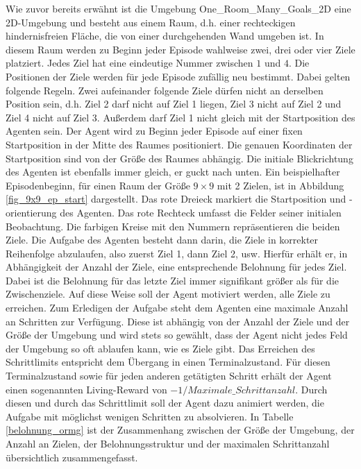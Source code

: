 Wie zuvor bereits erwähnt ist die Umgebung \glqq One\_Room\_Many\_Goals\_2D\grqq{} eine 2D-Umgebung und besteht aus einem Raum, d.h. einer rechteckigen hindernisfreien Fläche, die von einer durchgehenden Wand umgeben ist. In diesem Raum werden zu Beginn jeder Episode wahlweise zwei, drei oder vier Ziele platziert. Jedes Ziel hat eine eindeutige Nummer zwischen $1$ und $4$. Die Positionen der Ziele werden für jede Episode zufällig neu bestimmt. Dabei gelten folgende Regeln. Zwei aufeinander folgende Ziele dürfen nicht an derselben Position sein, d.h. Ziel 2 darf nicht auf Ziel 1 liegen, Ziel 3 nicht auf Ziel 2 und Ziel 4 nicht auf Ziel 3. Außerdem darf Ziel 1 nicht gleich mit der Startposition des Agenten sein. Der Agent wird zu Beginn jeder Episode auf einer fixen Startposition in der Mitte des Raumes positioniert. Die genauen Koordinaten der Startposition sind von der Größe des Raumes abhängig. Die initiale Blickrichtung des Agenten ist ebenfalls immer gleich, er guckt nach unten. Ein beispielhafter Episodenbeginn, für einen Raum der Größe $9 \times 9$ mit 2 Zielen, ist in Abbildung \ref{fig_9x9_ep_start} dargestellt. Das rote Dreieck markiert die Startposition und -orientierung des Agenten. Das rote Rechteck umfasst die Felder seiner initialen Beobachtung. Die farbigen Kreise mit den Nummern repräsentieren die beiden Ziele. Die Aufgabe des Agenten besteht dann darin, die Ziele in korrekter Reihenfolge abzulaufen, also zuerst Ziel 1, dann Ziel 2, usw. Hierfür erhält er, in Abhängigkeit der Anzahl der Ziele, eine entsprechende Belohnung für jedes Ziel. Dabei ist die Belohnung für das letzte Ziel immer signifikant größer als für die Zwischenziele. Auf diese Weise soll der Agent motiviert werden, alle Ziele zu erreichen. Zum Erledigen der Aufgabe steht dem Agenten eine maximale Anzahl an Schritten zur Verfügung. Diese ist abhängig von der Anzahl der Ziele und der Größe der Umgebung und wird stets so gewählt, dass der Agent nicht jedes Feld der Umgebung so oft ablaufen kann, wie es Ziele gibt. Das Erreichen des Schrittlimits entspricht dem Übergang in einen Terminalzustand. Für diesen Terminalzustand sowie für jeden anderen getätigten Schritt erhält der Agent einen sogenannten Living-Reward von $-1 / Maximale\_Schrittanzahl$. Durch diesen und durch das Schrittlimit soll der Agent dazu animiert werden, die Aufgabe mit möglichst wenigen Schritten zu absolvieren. In Tabelle \ref{belohnung_ormg} ist der Zusammenhang zwischen der Größe der Umgebung, der Anzahl an Zielen, der Belohnungsstruktur und der maximalen Schrittanzahl übersichtlich zusammengefasst.

